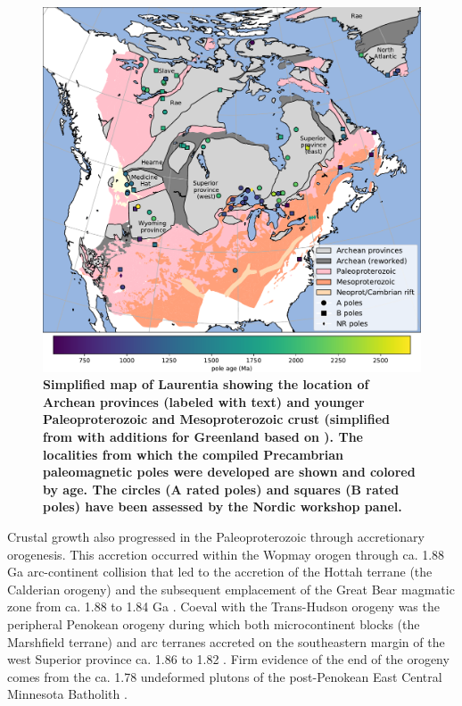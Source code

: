 \documentclass[11pt,letterpaper]{article}
\begin{document}
\begin{figure}
\centering
\includegraphics[width=\textwidth]{../Figures/Fig1_map.pdf}
\caption{\small{\textbf{Simplified map of Laurentia showing the location of Archean provinces (labeled with text) and younger Paleoproterozoic and Mesoproterozoic crust (simplified from \citealp{Whitmeyer2007a} with additions for Greenland based on \citealp{St-Onge2009a}). The localities from which the compiled Precambrian paleomagnetic poles were developed are shown and colored by age. The circles (A rated poles) and squares (B rated poles) have been assessed by the Nordic workshop panel.}}}
\label{fig:Laurentia_map}
\end{figure}

Crustal growth also progressed in the Paleoproterozoic through accretionary orogenesis. This accretion occurred within the Wopmay orogen through ca. 1.88 Ga arc-continent collision that led to the accretion of the Hottah terrane (the Calderian orogeny) and the subsequent emplacement of the Great Bear magmatic zone from ca. 1.88 to 1.84 Ga \citep{Hildebrand2009a}. Coeval with the Trans-Hudson orogeny was the peripheral Penokean orogeny during which both microcontinent blocks (the Marshfield terrane) and arc terranes accreted on the southeastern margin of the west Superior province ca. 1.86 to 1.82 \citep{Schulz2007a}. Firm evidence of the end of the orogeny comes from the ca. 1.78 undeformed plutons of the post-Penokean East Central Minnesota Batholith \citep{Holm2005a}.
\end{document}
